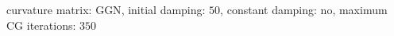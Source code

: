 curvature matrix: $\text{GGN}$, initial damping: $\num[scientific-notation=false]{50}$, constant damping: $\text{no}$, maximum CG iterations: $\num[scientific-notation=false]{350}$